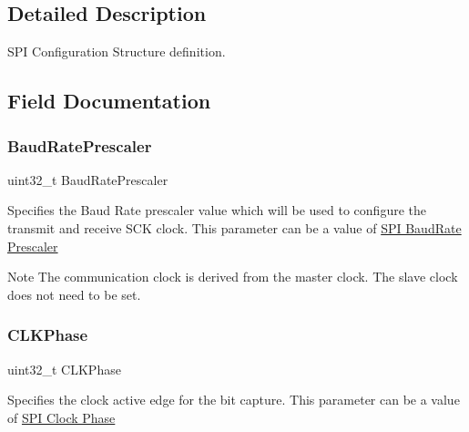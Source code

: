 \subsection{Detailed Description}
S\+PI Configuration Structure definition. 

\subsection{Field Documentation}
\mbox{\label{struct_s_p_i___init_type_def_a2fa72ad4f27606fffa2ec9456bcb0a56}} 
\subsubsection{\texorpdfstring{Baud\+Rate\+Prescaler}{BaudRatePrescaler}}
{\footnotesize\ttfamily uint32\+\_\+t Baud\+Rate\+Prescaler}

Specifies the Baud Rate prescaler value which will be used to configure the transmit and receive S\+CK clock. This parameter can be a value of \hyperlink{group___s_p_i___baud_rate___prescaler}{S\+PI Baud\+Rate Prescaler} \begin{DoxyNote}{Note}
The communication clock is derived from the master clock. The slave clock does not need to be set. 
\end{DoxyNote}
\mbox{\label{struct_s_p_i___init_type_def_aba7183911cbc41063270dab182de768f}} 
\subsubsection{\texorpdfstring{C\+L\+K\+Phase}{CLKPhase}}
{\footnotesize\ttfamily uint32\+\_\+t C\+L\+K\+Phase}

Specifies the clock active edge for the bit capture. This parameter can be a value of \hyperlink{group___s_p_i___clock___phase}{S\+PI Clock Phase} \mbox{\label{struct_s_p_i___init_type_def_a83f278c9d173d3cd021644692bf3c435}} 

